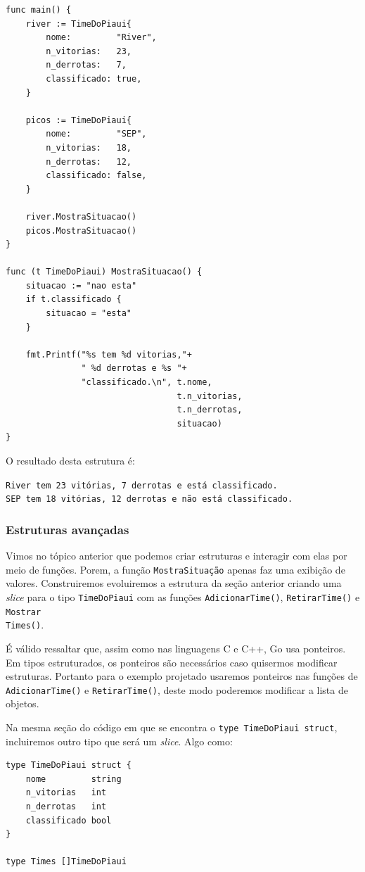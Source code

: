 \documentclass{SBCbookchapter}
\begin{document}
\begin{lstlisting}
func main() {
	river := TimeDoPiaui{
		nome:         "River",
		n_vitorias:   23,
		n_derrotas:   7,
		classificado: true,
	}
	
	picos := TimeDoPiaui{
		nome:         "SEP",
		n_vitorias:   18,
		n_derrotas:   12,
		classificado: false,
	}
	
	river.MostraSituacao()
	picos.MostraSituacao()
}

func (t TimeDoPiaui) MostraSituacao() {
	situacao := "nao esta"
	if t.classificado {
		situacao = "esta"
	}
	
	fmt.Printf("%s tem %d vitorias,"+
			   " %d derrotas e %s "+
			   "classificado.\n", t.nome,
							      t.n_vitorias,
							  	  t.n_derrotas,
								  situacao)
}

\end{lstlisting}

O resultado desta estrutura é:

\noindent\texttt{River tem 23 vitórias, 7 derrotas e está classificado.}\\
\texttt{SEP tem 18 vitórias, 12 derrotas e não está classificado.}

\subsubsection{Estruturas avançadas}

Vimos no tópico anterior que podemos criar estruturas e interagir com elas por meio de funções. Porem, a função \texttt{MostraSituação} apenas faz uma exibição de valores. Construiremos evoluiremos a estrutura da seção anterior criando uma \textit{slice} para o tipo \texttt{TimeDoPiaui} com as funções \texttt{AdicionarTime()}, \texttt{RetirarTime()} e \texttt{Mostrar\\Times()}. 

É válido ressaltar que, assim como nas linguagens C e C++, Go usa ponteiros. Em tipos estruturados, os ponteiros são necessários caso quisermos modificar estruturas. Portanto para o exemplo projetado usaremos ponteiros nas funções de \texttt{AdicionarTime()} e \texttt{RetirarTime()}, deste modo poderemos modificar a lista de objetos.

Na mesma seção do código em que se encontra o \texttt{type TimeDoPiaui struct}, incluiremos outro tipo que será um \textit{slice}. Algo como:

\begin{lstlisting}
type TimeDoPiaui struct {
	nome         string
	n_vitorias   int
	n_derrotas   int
	classificado bool
}

type Times []TimeDoPiaui
\end{lstlisting}
\end{document}
